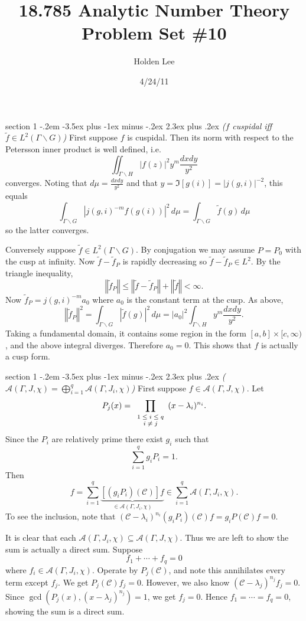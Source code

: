 \documentclass[12pt]{article}
\makeatletter
\theoremstyle{norm}
\providecommand{\cal}[1]{\mathcal{#1}}
\renewcommand{\cal}[1]{\mathcal{#1}}
\newcommand{\subeq}[0]{\subseteq}
\newcommand{\Ga}[0]{\Gamma}
\newcommand{\la}[0]{\lambda}
\newcommand{\ve}[1]{\left\Vert{#1}\right\Vert}
\newcommand{\bs}[0]{\backslash}
\newcommand{\iy}[0]{\infty}
\newenvironment{problem}{\@startsection
       {section}
       {1}
       {-.2em}
       {-3.5ex plus -1ex minus -.2ex}
       {2.3ex plus .2ex}
       {\pagebreak[3]%
       \large\bf\noindent{Problem }
       }
       }
       {
       }
\makeatother
\begin{document}
\title{18.785 Analytic Number Theory Problem Set \#10}%
\author{Holden Lee}
\date{4/24/11}%
\maketitle
\thispagestyle{empty}
\begin{problem}{\it ($f$ cuspidal iff $\tilde{f}\in L^2(\Ga\bs G)$)}
First suppose $f$ is cuspidal. Then its norm with respect to the Petersson inner product is well defined, i.e.
\[
\iint_{\Ga\bs H} |f(z)|^2 y^m\frac{dxdy}{y^2}
\]
converges. Noting that $d\mu=\frac{dx dy}{y^2}$ and that $y=\Im[g(i)]=|j(g,i)|^{-2}$, this equals 
\[
\int_{\Ga\bs G} |j(g,i)^{-m}f(g(i))|^2\,d\mu=\int_{\Ga\bs G} \tilde{f}(g)\,d\mu
\]
so the latter converges.

Conversely suppose $\tilde{f}\in L^2(\Ga\bs G)$. 
By conjugation we may assume $P=P_0$ with the cusp at infinity. 
Now $\tilde{f}-\tilde{f}_P$ is rapidly decreasing so $\tilde{f}-\tilde{f}_P\in L^2$. By the triangle inequality,
\[
\ve{\tilde{f}_P}\le \ve{\tilde{f}-\tilde{f}_P}+\ve{\tilde{f}}<\iy.
\]
Now $\tilde{f}_P=j(g,i)^{-m}a_0$ where $a_0$ is the constant term at the cusp. 
As above,
\[
\ve{\tilde{f}_P}^2=\int_{\Ga\bs G} |\tilde{f}(g)|^2\,d\mu=|a_0|^2\int_{\Ga\bs H} y^{m}\frac{dxdy}{y^2}.
\]
Taking a fundamental domain, it contains some region in the form $[a,b]\times [c,\iy)$, and the above integral diverges. Therefore $a_0=0$. This shows that $f$ is actually a cusp form.
\end{problem}
\begin{problem}{\it($\displaystyle \cal A(\Ga,J,\chi)=\bigoplus_{i=1}^q \cal A(\Ga,J_i,\chi)$)}
First suppose $f\in \cal A(\Ga,J,\chi)$. Let
\[
P_j(x)=\prod_{\scriptsize\begin{array}{c} 1\le i\le q\\i\ne j\end{array}}(x-\la_i)^{n_i}.
\]
Since the $P_i$ are relatively prime there exist $g_i$ such that 
\[
\sum_{i=1}^q g_iP_i=1.
\]
Then
\[
f=\sum_{i=1}^q \underbrace{[(g_iP_i)(\cal C)]f}_{\in \cal A(\Ga, J_i,\chi)}\in \sum_{i=1}^q \cal A(\Ga,J_i,\chi).
\]
To see the inclusion, note that $(\cal C-\la_i)^{n_i}(g_iP_i)(\cal C)f=g_iP(\cal C)f=0$.

It is clear that each $\cal A(\Ga,J_i,\chi)\subeq \cal A(\Ga,J,\chi)$. Thus we are left to show the sum is actually a direct sum. Suppose 
\[
f_1+\cdots +f_q=0
\]
where $f_i\in \cal A(\Ga, J_i,\chi)$. Operate by $P_j(\cal C)$, and note this annihilates every term except $f_j$. We get $P_j(\cal C)f_j=0$. However, we also know $(\cal C-\la_j)^{n_j}f_j=0$. Since $\gcd(P_j(x),(x-\la_j)^{n_j})=1$, we get $f_j=0$. Hence $f_1=\cdots =f_q=0$, showing the sum is a direct sum.
\end{problem}
\end{document}
